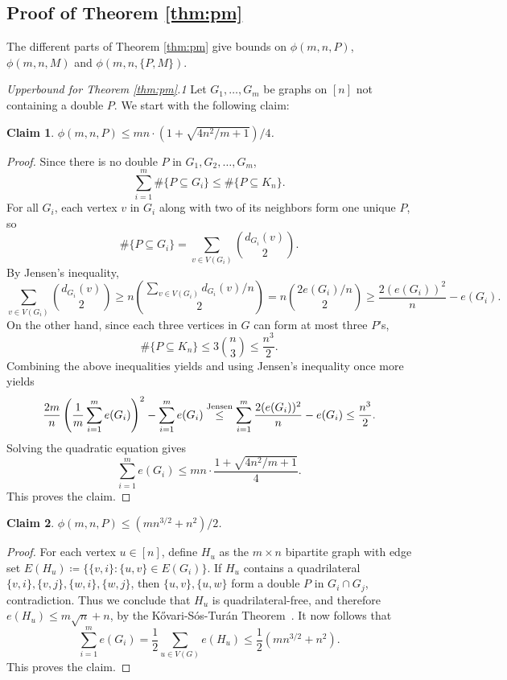 \documentclass[12pt]{article}
\newtheorem{claim}{Claim}[theorem]
\begin{document}
\subsection{Proof of Theorem \ref{thm:pm}}

The different parts of Theorem \ref{thm:pm} give bounds on $\phi(m,n,P)$, $\phi(m,n,M)$ and $\phi(m,n,\{P,M\})$. 

\textit{Upperbound for Theorem \ref{thm:pm}.1} Let $G_1, \ldots, G_m$ be graphs on $[n]$ not containing a double $P$. We start with the following claim:
  \begin{claim}
    $\phi(m, n, P) \leq mn \cdot (1 + \sqrt{4n^2/m + 1})/4$.
  \end{claim}

  \begin{proof}
    Since there is no double $P$ in $G_1,G_2,\dots,G_m$,
    \[
    \sum_{i = 1}^m \#\{P \subseteq G_i\} \leq \#\{P \subseteq K_n\}.
    \]
    For all $G_i$, each vertex $v$ in $G_i$ along with two of its neighbors form one unique $P$, so
    \[
      \#\{P \subseteq G_i\} = \sum_{v \in V(G_i)} \binom{d_{G_i}(v)}{2}.
    \]
    By Jensen's inequality,
    \[
      \sum_{v \in V(G_i)} \binom{d_{G_i}(v)}{2} \geq n\binom{\sum_{v \in V(G_i)} d_{G_i}(v)/n}{2} = n\binom{2e(G_i)/n}{2} \geq \frac{2(e(G_i))^2}{n} - e(G_i).
    \]
    On the other hand, since each three vertices in $G$ can form at most three $P$'s, 
    \[
      \#\{P \subseteq K_n\} \leq 3\binom{n}{3} \leq \frac{n^3}{2}.
    \]
    Combining the above inequalities yields and using Jensen's inequality once more yields
    \[
      \frac{2m}{n}\left(\frac{1}{m}\sum_{i = 1}^m e(G_i)\right)^2 - \sum_{i = 1}^m e(G_i) \overset{\rm Jensen}{\leq} \sum_{i = 1}^m \frac{2(e(G_i))^2}{n} - e(G_i) \leq \frac{n^3}{2}.
    \]
    Solving the quadratic equation gives
    \[
      \sum_{i = 1}^m e(G_i) \leq mn \cdot \frac{1 + \sqrt{4n^2/m + 1}}{4}.
    \]
    This proves the claim.
  \end{proof}

  \begin{claim}
    $\phi(m, n, P) \leq (mn^{3/2} + n^2)/2$. 
  \end{claim}

  \begin{proof}
    For each vertex $u \in [n]$, define $H_u$ as the $m \times n$ bipartite graph with edge set $E(H_u) \coloneq \{\{v, i\} : \{u, v\} \in E(G_i)\}$. If $H_u$ contains a quadrilateral $\{v, i\}, \{v, j\}, \{w, i\}, \{w, j\}$, then $\{u, v\}, \{u, w\}$ form a double $P$ in $G_i \cap G_j$, contradiction. Thus we conclude that $H_u$ is quadrilateral-free, and therefore $e(H_u) \leq m\sqrt{n} + n$, by the K\H{o}vari-S\'{o}s-Tur\'{a}n Theorem~\cite{KovariSosTuran1954}. It now follows that
    \[
      \sum_{i = 1}^m e(G_i) = \frac{1}{2}\sum_{u \in V(G)} e(H_u) \leq \frac{1}{2}(mn^{3/2} + n^2).
    \]
    This proves the claim.
  \end{proof}
  
\end{document}
